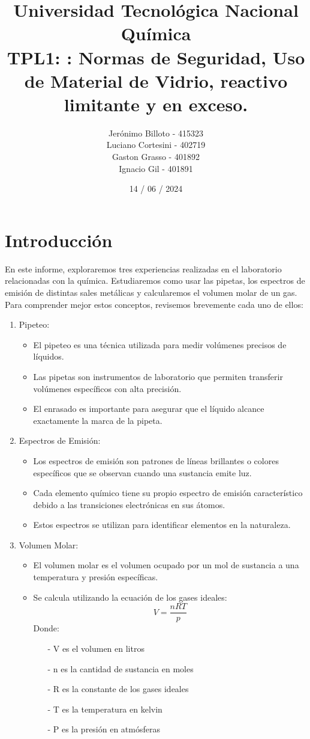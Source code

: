\documentclass[12pt]{report}
\title{%
  \fontsize{25}{0}\selectfont Universidad Tecnológica Nacional \\
  \fontsize{22}{30}\selectfont Química \\
  \fontsize{18}{25}\selectfont TPL1: : Normas de Seguridad, Uso de Material de Vidrio, reactivo limitante y en exceso.
}
\author{
  Jerónimo Billoto - 415323\\
  Luciano Cortesini - 402719\\
  Gaston Grasso - 401892\\
  Ignacio Gil - 401891\\
}
\date{14 / 06 / 2024}
\begin{document}
\maketitle
\section*{Introducción}
En este informe, exploraremos tres experiencias realizadas en el laboratorio relacionadas con la química. Estudiaremos como usar las pipetas, los espectros de emisión de distintas sales metálicas y calcularemos el volumen molar de un gas. Para comprender mejor estos conceptos, revisemos brevemente cada uno de ellos:

\begin{enumerate}
  \item Pipeteo:
    \begin{itemize}
      \item El pipeteo es una técnica utilizada para medir volúmenes precisos de líquidos.
      \item Las pipetas son instrumentos de laboratorio que permiten transferir volúmenes específicos con alta precisión.
      \item El enrasado es importante para asegurar que el líquido alcance exactamente la marca de la pipeta.
    \end{itemize}
  \item Espectros de Emisión:
    \begin{itemize}
      \item Los espectros de emisión son patrones de líneas brillantes o colores específicos que se observan cuando una sustancia emite luz.
      \item Cada elemento químico tiene su propio espectro de emisión característico debido a las transiciones electrónicas en sus átomos.
      \item Estos espectros se utilizan para identificar elementos en la naturaleza.
    \end{itemize}
  \item Volumen Molar:
    \begin{itemize}
      \item El volumen molar es el volumen ocupado por un mol de sustancia a una temperatura y presión específicas.
      \item Se calcula utilizando la ecuación de los gases ideales:
      $$V = \frac{nRT}{p}$$
      Donde: 
      \begin{itemize}
        \item[-] V es el volumen en litros
        \item[-] n es la cantidad de sustancia en moles
        \item[-] R es la constante de los gases ideales
        \item[-] T es la temperatura en kelvin
        \item[-] P es la presión en atmósferas
      \end{itemize}
    \end{itemize}
\end{enumerate}
\end{document}
